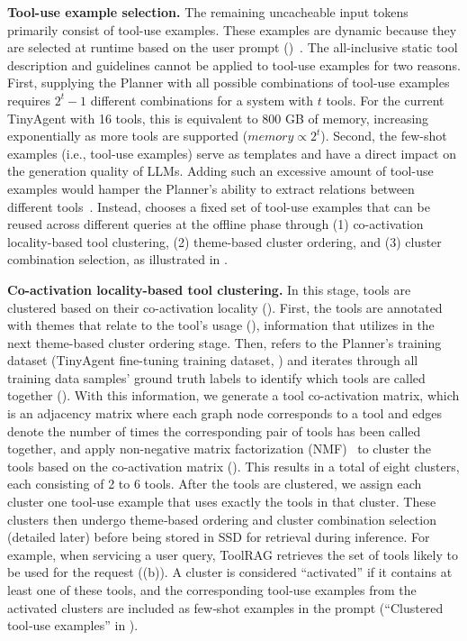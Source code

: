 {\bf Tool-use example selection.} The remaining uncacheable input tokens primarily consist of tool-use examples. These examples are dynamic because they are selected at runtime based on the user prompt ()~\cite{toolformer, rag_mcp, hugginggpt}. The all-inclusive static tool description and guidelines cannot be applied to tool-use examples for two reasons. First, supplying the Planner with all possible combinations of tool-use examples requires $2^t-1$ different combinations for a system with $t$ tools. For the current TinyAgent with 16 tools, this is equivalent to 800 GB of memory, increasing exponentially as more tools are supported ($memory \propto 2^t$). Second, the few-shot examples (i.e., tool-use examples) serve as templates and have a direct impact on the generation quality of LLMs. Adding such an excessive amount of tool-use examples would hamper the Planner's ability to extract relations between different tools~\cite{toolformer, rag_mcp, google_dev_function_calling}. Instead, \prefill chooses a fixed set of tool-use examples that can be reused across different queries at the offline phase through (1) co-activation locality-based tool clustering, (2) theme-based cluster ordering, and (3) cluster combination selection, as illustrated in .



{\bf Co-activation locality-based tool clustering.}
In this stage, tools are clustered based on their co-activation locality (). First, the tools are annotated with themes that relate to the tool's usage (), information that \prefill utilizes in the next theme-based cluster ordering stage. Then, \prefill refers to the Planner's training dataset (TinyAgent fine-tuning training dataset, ) and iterates through all training data samples' ground truth labels to identify which tools are called together (). With this information, we generate a tool co-activation matrix, which is an adjacency matrix where each graph node corresponds to a tool and edges denote the number of times the corresponding pair of tools has been called together, and apply non-negative matrix factorization (NMF)~\cite{nmf} to cluster the tools based on the co-activation matrix (). This results in a total of eight clusters, each consisting of 2 to 6 tools. After the tools are clustered, we assign each cluster one tool-use example that uses exactly the tools in that cluster. These clusters then undergo theme‑based ordering and cluster combination selection (detailed later) before being stored in SSD for retrieval during inference. For example, when servicing a user query, ToolRAG retrieves the set of tools likely to be used for the request ((b)). A cluster is considered ``activated'' if it contains at least one of these tools, and the corresponding tool‑use examples from the activated clusters are included as few‑shot examples in the prompt (``Clustered tool‑use examples'' in ).


